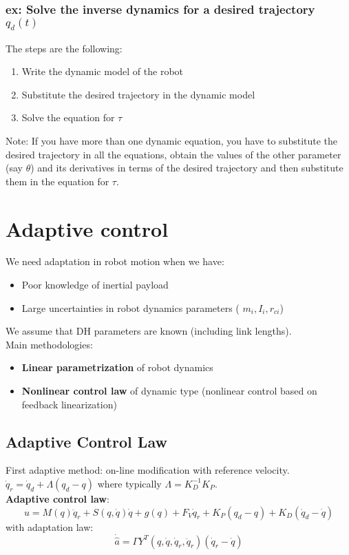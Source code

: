 \documentclass[a4paper,12pt]{article}
\begin{document}
\subsubsection{ex: Solve the inverse dynamics for a desired trajectory $q_d(t)$}
The steps are the following:
\begin{enumerate}
    \item Write the dynamic model of the robot
    \item Substitute the desired trajectory in the dynamic model
    \item Solve the equation for $\tau$
\end{enumerate}
Note: If you have more than one dynamic equation, you have to
substitute the desired trajectory in all the equations,
obtain the values of the other parameter (say $\theta$) and its derivatives
in terms of the desired trajectory and then substitute them in the
equation for $\tau$.





\section{Adaptive control}
We need adaptation in robot motion when we have:
\begin{itemize}
    \item Poor knowledge of inertial payload
    \item Large uncertainties in robot dynamics parameters (
        $m_i, I_i, r_{ci}$)
\end{itemize}
We assume that DH parameters are known (including link lengths).\\
Main methodologies:
\begin{itemize}
    \item \textbf{Linear parametrization} of robot dynamics 
    \item \textbf{Nonlinear control law} of dynamic type (nonlinear control
    based on feedback linearization) 
\end{itemize}
\subsection{Adaptive Control Law}
First adaptive method: on-line modification with reference velocity.\\
$\dot{q}_r = \dot{q}_d + \Lambda(q_d - q)$ where typically $\Lambda=K_D^{-1}K_P$.\\
\textbf{Adaptive control law}:
\begin{equation}
    u = M(q)\ddot{q}_r + S(q,\dot{q})\dot{q} + g(q) + F_V\dot{q}_r + K_P(q_d-q) + K_D(\dot{q}_d-\dot{q})
\end{equation}
with adaptation law:
\begin{equation}
    \dot{\hat{a}} = \Gamma Y^T(q,\dot{q},\dot{q}_r,\ddot{q}_r)(\dot{q}_r-\dot{q})
\end{equation}
\end{document}
